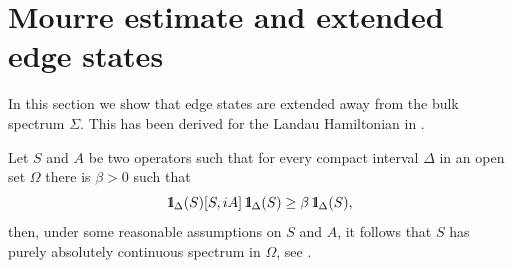 \documentclass[reqno,12pt,letterpaper]{amsart}
\newcommand{\CC}{{\mathbb C}}
\newcommand{\ZZ}{{\mathbb Z}}
\numberwithin{equation}{section}
\def\indic{\operatorname{1\hskip-2.75pt\relax l}}
\begin{document}


\iffalse
\section{Mourre estimate and extended edge states}
\label{sec:EES}
In this section we show that edge states are extended away from the bulk spectrum $\Sigma$. This has been derived for the Landau Hamiltonian in \cite{FGW}. 

Let $S$ and $A$ be two operators such that for every compact interval $\Delta$ in an open set $\Omega$ there is $\beta>0$ such that
\[ \indic_{\Delta}(S) [S,iA] \indic_{\Delta}(S) \ge \beta \indic_{\Delta}(S),\]
then, under some reasonable assumptions on $S$ and $A$, it follows that $S$ has purely absolutely continuous spectrum in $\Omega$, see \cite[Corr. $4.10$]{CFKS}.
\end{document}
